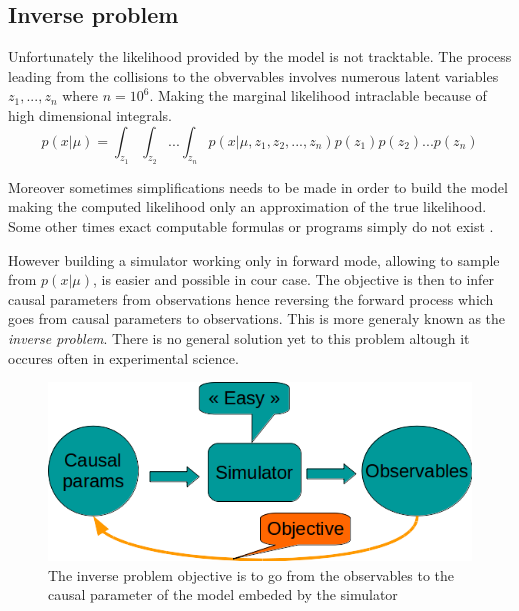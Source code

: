 \subsection{Inverse problem} %
\label{sub:inverse_problem}


Unfortunately the likelihood provided by the model is not tracktable.
The process leading from the collisions to the obvervables involves numerous latent variables $z_1, ..., z_n$ where $n=10^6$.
Making the marginal likelihood intraclable because of high dimensional integrals.
\begin{equation}
	\label{eq:intractable_integral}
	p(x|\mu) = \int_{z_1} \int_{z_2} ... \int_{z_n} p(x|\mu, z_1, z_2, ..., z_n) p(z_1) p(z_2) ... p(z_n)
\end{equation}


Moreover sometimes simplifications needs to be made in order to build the model \needcite making the computed likelihood only an approximation of the true likelihood.
Some other times exact computable formulas or programs simply do not exist \needcite.



However building a simulator working only in forward mode, \ie allowing to sample from $p(x|\mu)$, is easier and possible in cour case.
The objective is then to infer causal parameters from observations hence reversing the forward process which goes from causal parameters to observations.
This is more generaly known as the \emph{inverse problem}.
There is no general solution yet to this problem altough it occures often in experimental science.


\begin{figure}[htb]
    \centering
    \includegraphics[width=0.8\linewidth]{inverse_problem}
    \caption{The inverse problem objective is to go from the observables to the causal parameter of the model embeded by the simulator}
    \label{fig:inverse_problem}
\end{figure}



